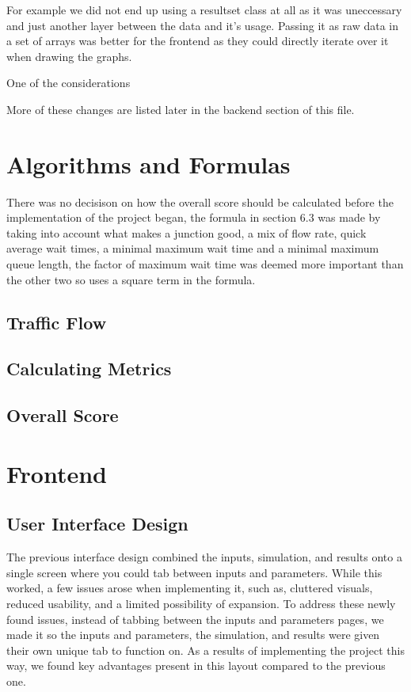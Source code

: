 \documentclass{article}
\begin{document}
    For example we did not end up using a resultset class at all as it was uneccessary and just another layer between
    the data and it's usage. Passing it as raw data in a set of arrays was better for the frontend as they could
    directly iterate over it when drawing the graphs.

    One of the considerations

    More of these changes are listed later in the backend section of this file.


    \section{Algorithms and Formulas}

    There was no decisison on how the overall score should be calculated before the implementation of the project
    began, the formula in section 6.3 was made by taking into account what makes a junction good,
    a mix of flow rate, quick average wait times, a minimal maximum wait time and a minimal maximum queue length, the
    factor of maximum wait time was deemed more important than the other two so uses a square term in the formula.

    \subsection{Traffic Flow}

    \subsection{Calculating Metrics}

    \subsection{Overall Score}


    \section{Frontend}

    \subsection{User Interface Design}
    The previous interface design combined the inputs, simulation, and results onto a single screen where you could tab between inputs and parameters. While this worked,
    a few issues arose when implementing it, such as, cluttered visuals, reduced usability, and a limited possibility of expansion. To address these newly found issues,
    instead of tabbing between the inputs and parameters pages, we made it so the inputs and parameters, the simulation, and results were given their own unique tab to
    function on. As a results of implementing the project this way, we found key advantages present in this layout compared to the previous one.
\end{document}
